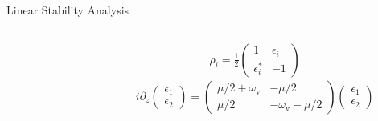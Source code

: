\begin{frame}{Linear Stability Analysis}
\begin{columns}[T]
\begin{column}{0.45\textwidth}
   \end{column}%
\begin{column}{0.55\textwidth}
\pause
  \vspace{-1em}
   \begin{align*}
      \rho_i = \frac{1}{2}\begin{pmatrix}
      1 & \epsilon_i\\
      \epsilon_i^* & -1
      \end{pmatrix}
   \end{align*}
\pause
\begin{equation*}
i\partial_{z}\begin{pmatrix}
\epsilon_1 \\
\epsilon_2
\end{pmatrix} = \begin{pmatrix}
\mu/2 + \omega_{\mathrm v}   &  -\mu/2  \\
\mu/2 & -\omega_{\mathrm v} - \mu/2
\end{pmatrix}\begin{pmatrix}
\epsilon_1 \\
\epsilon_2
\end{pmatrix}
\end{equation*}


\end{column}%
\end{columns}



\end{frame}


